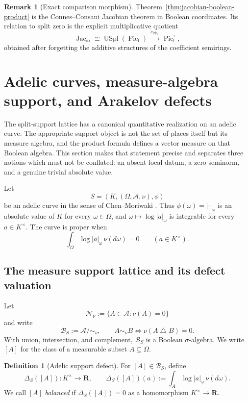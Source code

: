 \documentclass[11pt]{amsart}
\numberwithin{equation}{section}
\theoremstyle{definition}
\newtheorem{definition}[theorem]{Definition}
\newtheorem{remark}[theorem]{Remark}
\newcommand{\R}{\mathbf R}
\newcommand{\Picf}{\operatorname{Pic}_{\mathrm f}}
\newcommand{\Jacar}{\operatorname{Jac}_{\mathrm{ar}}}
\begin{document}
\begin{remark}[Exact comparison morphism]
Theorem~\ref{thm:jacobian-boolean-product} is the Connes--Consani Jacobian
theorem in Boolean coordinates.  Its relation to split zero is the explicit
multiplicative quotient
\[
\Jacar\cong\operatorname{USpl}(\Picf)
\xrightarrow{\ c_{\Picf}\ }
\Picf^\tau,
\]
obtained after forgetting the additive structures of the coefficient
semirings.
\end{remark}

\section{Adelic curves, measure-algebra support, and Arakelov defects}
\label{sec:adelic-support-defect}

The split-support lattice has a canonical quantitative realization on an
adelic curve.  The appropriate support object is not the set of places
itself but its measure algebra, and the product formula defines a vector
measure on that Boolean algebra.  This section makes that statement precise
and separates three notions which must not be conflated: an absent local
datum, a zero seminorm, and a genuine trivial absolute value.

Let
\[
S=(K,(\Omega,\mathcal A,\nu),\phi)
\]
be an adelic curve in the sense of Chen--Moriwaki
\cite{ChenMoriwakiBook,ChenMoriwakiIntersection}.  Thus
$\phi(\omega)=|\cdot|_\omega$ is an absolute value of $K$ for every
$\omega\in\Omega$, and $\omega\mapsto\log|a|_\omega$ is integrable for
every $a\in K^\times$.  The curve is proper when
\[
\int_\Omega\log|a|_\omega\,\nu(d\omega)=0
\qquad(a\in K^\times).
\]

\subsection{The measure support lattice and its defect valuation}

Let
\[
\mathcal N_\nu:=\{A\in\mathcal A:\nu(A)=0\}
\]
and write
\[
\mathscr B_S:=\mathcal A/\!\sim_\nu,
\qquad
A\sim_\nu B\iff\nu(A\mathbin\triangle B)=0.
\]
With union, intersection, and complement, $\mathscr B_S$ is a Boolean
$\sigma$-algebra.  We write $[A]$ for the class of a measurable subset
$A\subseteq\Omega$.

\begin{definition}[Adelic support defect]
\label{def:adelic-support-defect}
For $[A]\in\mathscr B_S$, define
\[
\Delta_S([A]):K^\times\longrightarrow\R,
\qquad
\Delta_S([A])(a)
:=\int_A\log|a|_\omega\,\nu(d\omega).
\]
We call $[A]$ \emph{balanced} if $\Delta_S([A])=0$ as a homomorphism
$K^\times\to\R$.
\end{definition}
\end{document}
